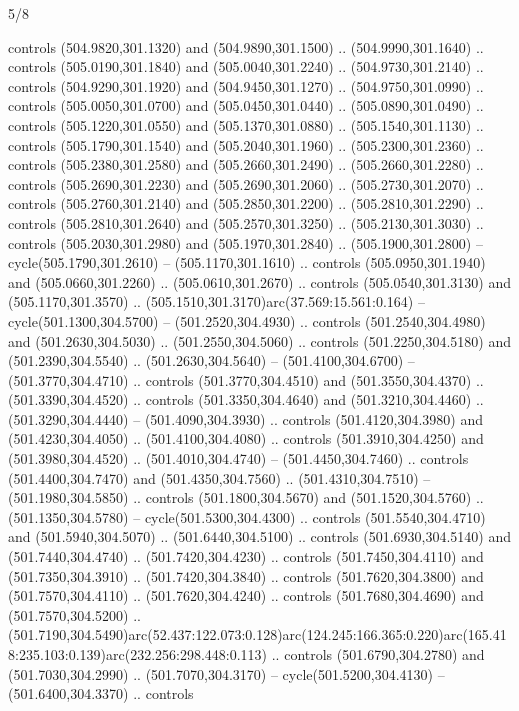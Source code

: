 \begin{flagdescription}{5/8}
\begin{scope}[xshift=0.5\flaglength,yshift=0.5\flagwidth,scale=\flagwidth/475.63]
\begin{scope}[y=0.8pt, x=0.8pt, yscale=-1, xscale=1,shift={(-450,-300)}]
\begin{scope}[cm={{1.0,0.0,0.0,1.0,(-0.0002,0.12556)}},cm={{1.0,0.0,0.0,1.0,(0.00179,0.0)}}]
\begin{scope}[cm={{1.11592,0.0,0.0,1.11592,(-106.89933,-41.77764)}}]
\begin{scope}[draw=black,fill=cfff]
\begin{scope}[fill=black]
  controls (504.9820,301.1320) and (504.9890,301.1500) .. (504.9990,301.1640) ..
  controls (505.0190,301.1840) and (505.0040,301.2240) .. (504.9730,301.2140) ..
  controls (504.9290,301.1920) and (504.9450,301.1270) .. (504.9750,301.0990) ..
  controls (505.0050,301.0700) and (505.0450,301.0440) .. (505.0890,301.0490) ..
  controls (505.1220,301.0550) and (505.1370,301.0880) .. (505.1540,301.1130) ..
  controls (505.1790,301.1540) and (505.2040,301.1960) .. (505.2300,301.2360) ..
  controls (505.2380,301.2580) and (505.2660,301.2490) .. (505.2660,301.2280) ..
  controls (505.2690,301.2230) and (505.2690,301.2060) .. (505.2730,301.2070) ..
  controls (505.2760,301.2140) and (505.2850,301.2200) .. (505.2810,301.2290) ..
  controls (505.2810,301.2640) and (505.2570,301.3250) .. (505.2130,301.3030) ..
  controls (505.2030,301.2980) and (505.1970,301.2840) .. (505.1900,301.2800) --
  cycle(505.1790,301.2610) -- (505.1170,301.1610) .. controls
  (505.0950,301.1940) and (505.0660,301.2260) .. (505.0610,301.2670) .. controls
  (505.0540,301.3130) and (505.1170,301.3570) ..
  (505.1510,301.3170)arc(37.569:15.561:0.164) -- cycle(501.1300,304.5700) --
  (501.2520,304.4930) .. controls (501.2540,304.4980) and (501.2630,304.5030) ..
  (501.2550,304.5060) .. controls (501.2250,304.5180) and (501.2390,304.5540) ..
  (501.2630,304.5640) -- (501.4100,304.6700) -- (501.3770,304.4710) .. controls
  (501.3770,304.4510) and (501.3550,304.4370) .. (501.3390,304.4520) .. controls
  (501.3350,304.4640) and (501.3210,304.4460) .. (501.3290,304.4440) --
  (501.4090,304.3930) .. controls (501.4120,304.3980) and (501.4230,304.4050) ..
  (501.4100,304.4080) .. controls (501.3910,304.4250) and (501.3980,304.4520) ..
  (501.4010,304.4740) -- (501.4450,304.7460) .. controls (501.4400,304.7470) and
  (501.4350,304.7560) .. (501.4310,304.7510) -- (501.1980,304.5850) .. controls
  (501.1800,304.5670) and (501.1520,304.5760) .. (501.1350,304.5780) --
  cycle(501.5300,304.4300) .. controls (501.5540,304.4710) and
  (501.5940,304.5070) .. (501.6440,304.5100) .. controls (501.6930,304.5140) and
  (501.7440,304.4740) .. (501.7420,304.4230) .. controls (501.7450,304.4110) and
  (501.7350,304.3910) .. (501.7420,304.3840) .. controls (501.7620,304.3800) and
  (501.7570,304.4110) .. (501.7620,304.4240) .. controls (501.7680,304.4690) and
  (501.7570,304.5200) ..
  (501.7190,304.5490)arc(52.437:122.073:0.128)arc(124.245:166.365:0.220)arc(165.418:235.103:0.139)arc(232.256:298.448:0.113)
  .. controls (501.6790,304.2780) and (501.7030,304.2990) .. (501.7070,304.3170)
  -- cycle(501.5200,304.4130) -- (501.6400,304.3370) .. controls

\end{scope}
\end{scope}
\end{scope}
\end{scope}
\end{scope}
\end{scope}
\end{flagdescription}
